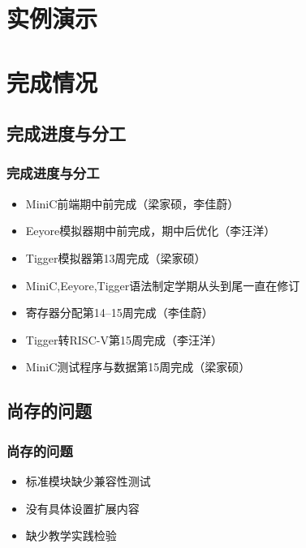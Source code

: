 \documentclass{beamer}
\begin{document}
\section{实例演示}


\section{完成情况}

\subsection{完成进度与分工}

\begin{frame}
    \frametitle{完成进度与分工}
    \begin{itemize}
        \item MiniC前端\qquad\qquad 期中前完成（梁家硕，李佳蔚）
        \item Eeyore模拟器\qquad\qquad 期中前完成，期中后优化（李汪洋）
        \item Tigger模拟器\qquad\qquad 第13周完成（梁家硕）
        \item MiniC,Eeyore,Tigger语法制定\qquad 学期从头到尾一直在修订
        \item 寄存器分配\qquad\qquad 第14--15周完成（李佳蔚）
        \item Tigger转RISC-V\qquad\qquad 第15周完成（李汪洋）
        \item MiniC测试程序与数据\qquad 第15周完成（梁家硕）
    \end{itemize}
\end{frame}

\subsection{尚存的问题}

\begin{frame}
    \frametitle{尚存的问题}
    \begin{itemize}
        \setlength{\itemsep}{.5cm}
        \item 标准模块缺少兼容性测试
        \item 没有具体设置扩展内容
        \item 缺少教学实践检验
    \end{itemize}
\end{frame}
\end{document}
